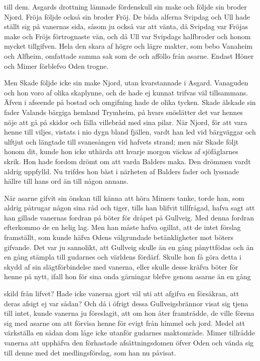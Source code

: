 till dem. Asgards drottning lämnade fördenskull sin make och följde sin
broder Njord. Fröja följde också sin broder Fröj. De båda alferna
Svipdag och Ull hade ställt sig på vanernas sida, såsom ju också var att
vänta, då Svipdag var Fröjas make och Fröjs förtrognaste vän, och då Ull
var Svipdags halfbroder och honom mycket tillgifven. Hela den skara af
högre och lägre makter, som bebo Vanaheim och Alfheim, omfattade samma
sak som de och afföllo från asarne. Endast Höner och Mimer förblefvo
Oden trogne.

Men Skade följde icke sin make Njord, utan kvarstannade i Asgard.
Vanaguden och hon voro af olika skaplynne, och de hade ej kunnat trifvas
väl tillsammans. Äfven i afseende på bostad och omgifning hade de olika
tycken. Skade älskade sin fader Valands bärgiga hemland Trymheim, på
hvars snöslätter det var hennes nöje att gå på skidor och fälla
villebråd med sina pilar. När Njord, för att vara henne till viljes,
vistats i nio dygn bland fjällen, vardt han led vid bärgväggar och
ulftjut och längtade till svanesången vid hafvets strand; men när Skade
följt honom dit, kunde hon icke uthärda att hvarje morgon väckas af
sjöfåglarnes skrik. Hon hade fordom drömt om att varda Balders maka. Den
drömmen vardt aldrig uppfylld. Nu trifdes hon bäst i närheten af Balders
fader och lyssnade hällre till hans ord än till någon annans.

När asarne gifvit sin önskan till känna att höra Mimers tanke, torde
han, som aldrig påtrugar någon sina råd och tiger, tills han blifvit
tillfrågad, hafva sagt att han gillade vanernas fordran på böter för
dråpet på Gullveig. Med denna fordran efterkommo de en helig lag. Men
han måste hafva ogillat, att de intet förslag framställt, som kunde
häfva Odens välgrundade betänkligheter mot böters gifvande. Det var ju
sannolikt, att Gullveig skulle än en gång pånyttfödas och än en gång
stämpla till gudarnes och världens fördärf. Skulle hon få göra detta i
skydd af sin slägtförbindelse med vanerna, eller skulle desse kräfva
böter för henne på nytt, ifall hon för sina onda gärningar blefve genom
asarne än en gång

skild från lifvet? Hade icke vanerna gjort väl uti att afgifva en
försäkran, att deras afsigt ej var sådan? Och då i öfrigt dessa
Gullveigsbrännor visat sig tjena till intet, kunde vanerna ju
föreslagit, att om hon åter framträdde, de ville förena sig med asarne
om att förvisa henne för evigt från himmel och jord. Medel att
värkställa en sådan dom låge icke utanför gudarnes maktområde. Mimer
tillrådde vanerna att upphäfva den förhastade afsättningsdomen öfver
Oden och vända sig till denne med det medlingsförslag, som han nu
påvisat.

